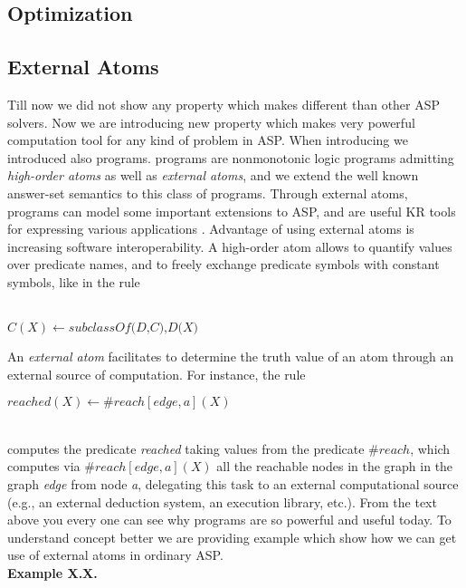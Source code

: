 \documentclass[14pt,a4paper, titlepage]{article}
\begin{document}
\subsection{Optimization}

\subsection{External Atoms}
Till now we did not show any property which makes \dlvhex{} different than other ASP solvers. Now we are introducing new property which makes \dlvhex{} very powerful computation tool for any kind of problem in ASP. When introducing \dlvhex{} we introduced also \hex{} programs. \hex{} programs are nonmonotonic logic programs admitting \textit{high-order atoms} as well as \textit{external atoms}, and we extend the well known answer-set semantics to this class of programs. Through external atoms, \hex{} programs can model some important extensions to ASP, and are useful KR tools for expressing various applications \cite{extatoms}. Advantage of using external atoms is increasing software interoperability. A high-order atom allows to quantify values over predicate names, and to freely exchange predicate symbols with constant symbols, like in the rule \centerline{\\$C(X) \leftarrow \textit{subclassOf(D,C),D(X)}$}
An \textit{external atom} facilitates to determine the truth value of an atom through an external source of computation. For instance, the rule \\ \centerline{ \textit{$reached(X) \leftarrow \#reach[edge,a](X)$}}
\\computes the predicate \textit{reached} taking values from the predicate $\#reach$, which computes via \textit{$\#reach[edge,a](X)$} all the reachable nodes in the graph in the graph \textit{edge} from node \textit{a}, delegating this task to an external computational source (e.g., an external deduction system, an execution library, etc.). From the text above you every one can see why \hex{} programs are so powerful and useful today. To understand concept better we are providing example which show how we can get use of external atoms in ordinary ASP.
\\ \textbf{Example X.X.}     
\end{document}
